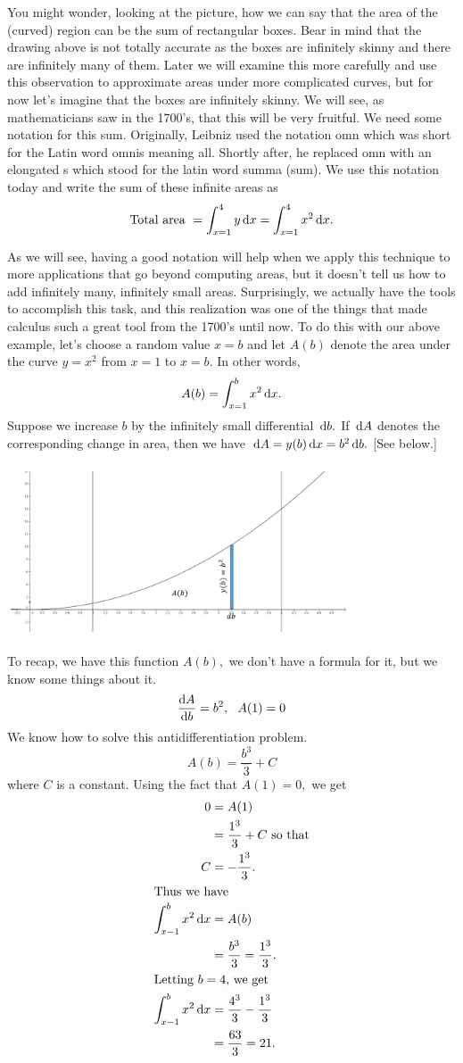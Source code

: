   You might wonder, looking at the picture, how we can say that the
  area of the (curved) region can be the sum of rectangular boxes.
  Bear in mind that the drawing above is not totally accurate as the
  boxes are infinitely skinny and there are infinitely many of them.
  Later we will examine this more carefully and use this observation
  to approximate areas under more complicated curves, but for now
  let’s imagine that the boxes are infinitely skinny.  We will see, as
  mathematicians saw in the 1700’s, that this will be very fruitful.
  We need some notation for this sum.  Originally, Leibniz used the
  notation omn which was short for the Latin word omnis meaning all.
  Shortly after, he replaced omn with an elongated s which stood for
  the latin word summa (sum).  We use this notation today and write
  the sum of these infinite areas as 
$$
\text{Total area } =\int_{x=1}^4 y \thinspace{\rm d}x =\int_{x=1}^4x^2 \thinspace{\rm d}x.
$$

As we will see, having a good notation will help when we apply this
technique to more applications that go beyond computing areas, but it
doesn’t tell us how to add infinitely many, infinitely small areas.
Surprisingly, we actually have the tools to accomplish this task, and
this realization was one of the things that made calculus such a great
tool from the 1700’s until now.  To do this with our above example,
let’s choose a random value $x=b$ and let $A(b)$ denote the area under the
curve $y=x^2$ from $x=1$ to $x=b.$  In other words,  
$$
A(b)=\int_{x=1}^bx^2 \thinspace{\rm d}x.
$$
Suppose we increase $b$ by the infinitely small differential $\thinspace{\rm d}b.$
If $\thinspace{\rm d}A$
denotes the corresponding change in area, then we have $\thinspace{\rm d}A=y(b)\thinspace{\rm d}x=b^2
\thinspace{\rm d}b.$ [See below.] \\
\centerline{\includegraphics*[height=2in,width=4in]{Figures/FTC-4}}
To recap, we have this function $A(b),$ we don’t have a formula for it,
but we know some things about it. 
$$
\frac{\text{d}{A}}{\text{d}{b}}=b^2,\ \      A(1)=0
$$
We know how to solve this antidifferentiation problem.
$$
A(b)=\frac{b^3}{3}+C
$$
where $C$ is a constant. Using the fact that $A(1)=0,$ we get
\begin{align*}
  0&=A(1)\\
   &=\frac{1^3}{3}+C \text{ so that}\\
  C&=-\frac{1^3}{3}.\\
\intertext{Thus we have}
\int_{x-1}^bx^2\thinspace{\rm d}x &= A(b)\\
&= \frac{b^3}{3}=\frac{1^3}{3}.\\
\intertext{Letting $b=4,$ we get} 
\int_{x-1}^bx^2\thinspace{\rm d}x &= \frac{4^3}{3}-\frac{1^3}{3}\\
&= \frac{63}{3}= 21.
\end{align*}

